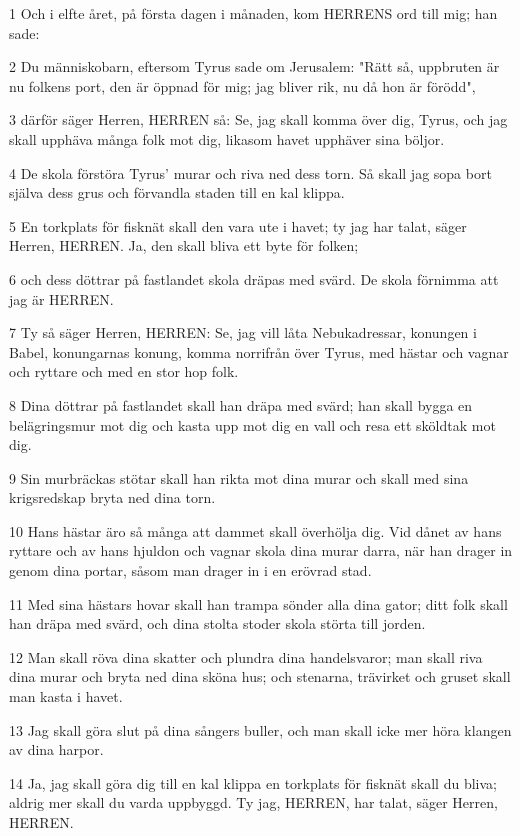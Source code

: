 \par 1 Och i elfte året, på första dagen i månaden, kom HERRENS ord till mig; han sade:
\par 2 Du människobarn, eftersom Tyrus sade om Jerusalem: "Rätt så, uppbruten är nu folkens port, den är öppnad för mig; jag bliver rik, nu då hon är förödd",
\par 3 därför säger Herren, HERREN så: Se, jag skall komma över dig, Tyrus, och jag skall upphäva många folk mot dig, likasom havet upphäver sina böljor.
\par 4 De skola förstöra Tyrus' murar och riva ned dess torn. Så skall jag sopa bort själva dess grus och förvandla staden till en kal klippa.
\par 5 En torkplats för fisknät skall den vara ute i havet; ty jag har talat, säger Herren, HERREN. Ja, den skall bliva ett byte för folken;
\par 6 och dess döttrar på fastlandet skola dräpas med svärd. De skola förnimma att jag är HERREN.
\par 7 Ty så säger Herren, HERREN: Se, jag vill låta Nebukadressar, konungen i Babel, konungarnas konung, komma norrifrån över Tyrus, med hästar och vagnar och ryttare och med en stor hop folk.
\par 8 Dina döttrar på fastlandet skall han dräpa med svärd; han skall bygga en belägringsmur mot dig och kasta upp mot dig en vall och resa ett sköldtak mot dig.
\par 9 Sin murbräckas stötar skall han rikta mot dina murar och skall med sina krigsredskap bryta ned dina torn.
\par 10 Hans hästar äro så många att dammet skall överhölja dig. Vid dånet av hans ryttare och av hans hjuldon och vagnar skola dina murar darra, när han drager in genom dina portar, såsom man drager in i en erövrad stad.
\par 11 Med sina hästars hovar skall han trampa sönder alla dina gator; ditt folk skall han dräpa med svärd, och dina stolta stoder skola störta till jorden.
\par 12 Man skall röva dina skatter och plundra dina handelsvaror; man skall riva dina murar och bryta ned dina sköna hus; och stenarna, trävirket och gruset skall man kasta i havet.
\par 13 Jag skall göra slut på dina sångers buller, och man skall icke mer höra klangen av dina harpor.
\par 14 Ja, jag skall göra dig till en kal klippa en torkplats för fisknät skall du bliva; aldrig mer skall du varda uppbyggd. Ty jag, HERREN, har talat, säger Herren, HERREN.

